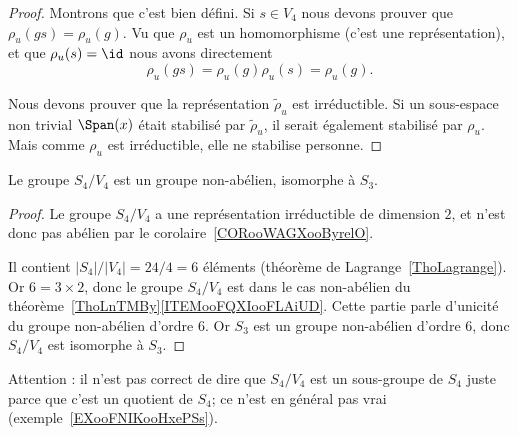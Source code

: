 \begin{proof}
	Montrons que c'est bien défini. Si \( s\in V_4\) nous devons prouver que \( \rho_u(gs)=\rho_u(g)\). Vu que \( \rho_u\) est un homomorphisme (c'est une représentation), et que \( \rho_u(s)=\id\) nous avons directement
	\begin{equation}
		\rho_u(gs)=\rho_u(g)\rho_u(s)=\rho_u(g).
	\end{equation}

	Nous devons prouver que la représentation \( \tilde \rho_u\) est irréductible. Si un sous-espace non trivial \( \Span(x)\) était stabilisé par \( \tilde \rho_u\), il serait également stabilisé par \( \rho_u\). Mais comme \( \rho_u\) est irréductible, elle ne stabilise personne.
\end{proof}

\begin{lemma}
	Le groupe \( S_4/V_4\) est un groupe non-abélien, isomorphe à \( S_3\).
\end{lemma}

\begin{proof}
	Le groupe \( S_4/V_4\) a une représentation irréductible de dimension \( 2\), et n'est donc pas abélien par le corolaire~\ref{CORooWAGXooByrelO}.

	Il contient \( | S_4 |/| V_4 |=24/4=6\) éléments (théorème de Lagrange~\ref{ThoLagrange}). Or \( 6=3\times 2\), donc le groupe \( S_4/V_4\) est dans le cas non-abélien du théorème~\ref{ThoLnTMBy}\ref{ITEMooFQXIooFLAiUD}. Cette partie parle d'unicité du groupe non-abélien d'ordre \( 6\). Or \( S_3\) est un groupe non-abélien d'ordre \( 6\), donc \( S_4/V_4\) est isomorphe à \( S_3\).
\end{proof}

Attention : il n'est pas correct de dire que \( S_4/V_4\) est un sous-groupe de \( S_4\) juste parce que c'est un quotient de \( S_4\); ce n'est en général pas vrai (exemple~\ref{EXooFNIKooHxePSs}).

